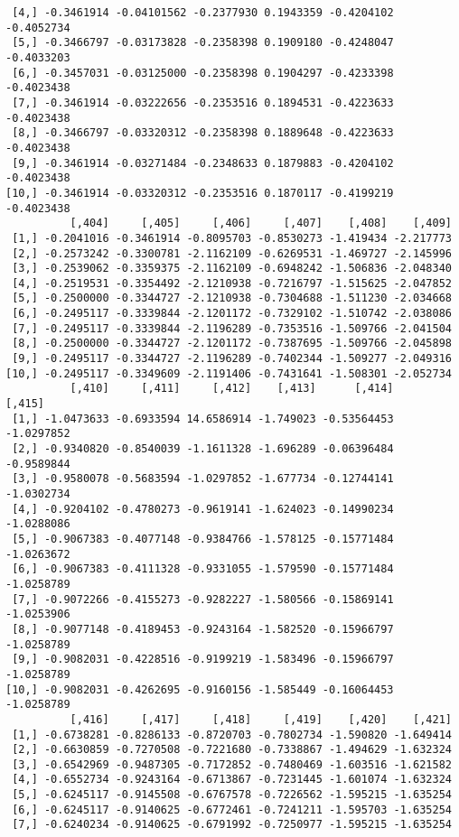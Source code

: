 \documentclass[
  letterpaper,
  DIV=11,
  numbers=noendperiod]{scrreprt}
\begin{document}
\begin{verbatim}
 [4,] -0.3461914 -0.04101562 -0.2377930 0.1943359 -0.4204102 -0.4052734
 [5,] -0.3466797 -0.03173828 -0.2358398 0.1909180 -0.4248047 -0.4033203
 [6,] -0.3457031 -0.03125000 -0.2358398 0.1904297 -0.4233398 -0.4023438
 [7,] -0.3461914 -0.03222656 -0.2353516 0.1894531 -0.4223633 -0.4023438
 [8,] -0.3466797 -0.03320312 -0.2358398 0.1889648 -0.4223633 -0.4023438
 [9,] -0.3461914 -0.03271484 -0.2348633 0.1879883 -0.4204102 -0.4023438
[10,] -0.3461914 -0.03320312 -0.2353516 0.1870117 -0.4199219 -0.4023438
          [,404]     [,405]     [,406]     [,407]    [,408]    [,409]
 [1,] -0.2041016 -0.3461914 -0.8095703 -0.8530273 -1.419434 -2.217773
 [2,] -0.2573242 -0.3300781 -2.1162109 -0.6269531 -1.469727 -2.145996
 [3,] -0.2539062 -0.3359375 -2.1162109 -0.6948242 -1.506836 -2.048340
 [4,] -0.2519531 -0.3354492 -2.1210938 -0.7216797 -1.515625 -2.047852
 [5,] -0.2500000 -0.3344727 -2.1210938 -0.7304688 -1.511230 -2.034668
 [6,] -0.2495117 -0.3339844 -2.1201172 -0.7329102 -1.510742 -2.038086
 [7,] -0.2495117 -0.3339844 -2.1196289 -0.7353516 -1.509766 -2.041504
 [8,] -0.2500000 -0.3344727 -2.1201172 -0.7387695 -1.509766 -2.045898
 [9,] -0.2495117 -0.3344727 -2.1196289 -0.7402344 -1.509277 -2.049316
[10,] -0.2495117 -0.3349609 -2.1191406 -0.7431641 -1.508301 -2.052734
          [,410]     [,411]     [,412]    [,413]      [,414]     [,415]
 [1,] -1.0473633 -0.6933594 14.6586914 -1.749023 -0.53564453 -1.0297852
 [2,] -0.9340820 -0.8540039 -1.1611328 -1.696289 -0.06396484 -0.9589844
 [3,] -0.9580078 -0.5683594 -1.0297852 -1.677734 -0.12744141 -1.0302734
 [4,] -0.9204102 -0.4780273 -0.9619141 -1.624023 -0.14990234 -1.0288086
 [5,] -0.9067383 -0.4077148 -0.9384766 -1.578125 -0.15771484 -1.0263672
 [6,] -0.9067383 -0.4111328 -0.9331055 -1.579590 -0.15771484 -1.0258789
 [7,] -0.9072266 -0.4155273 -0.9282227 -1.580566 -0.15869141 -1.0253906
 [8,] -0.9077148 -0.4189453 -0.9243164 -1.582520 -0.15966797 -1.0258789
 [9,] -0.9082031 -0.4228516 -0.9199219 -1.583496 -0.15966797 -1.0258789
[10,] -0.9082031 -0.4262695 -0.9160156 -1.585449 -0.16064453 -1.0258789
          [,416]     [,417]     [,418]     [,419]    [,420]    [,421]
 [1,] -0.6738281 -0.8286133 -0.8720703 -0.7802734 -1.590820 -1.649414
 [2,] -0.6630859 -0.7270508 -0.7221680 -0.7338867 -1.494629 -1.632324
 [3,] -0.6542969 -0.9487305 -0.7172852 -0.7480469 -1.603516 -1.621582
 [4,] -0.6552734 -0.9243164 -0.6713867 -0.7231445 -1.601074 -1.632324
 [5,] -0.6245117 -0.9145508 -0.6767578 -0.7226562 -1.595215 -1.635254
 [6,] -0.6245117 -0.9140625 -0.6772461 -0.7241211 -1.595703 -1.635254
 [7,] -0.6240234 -0.9140625 -0.6791992 -0.7250977 -1.595215 -1.635254

\end{verbatim}
\end{document}
